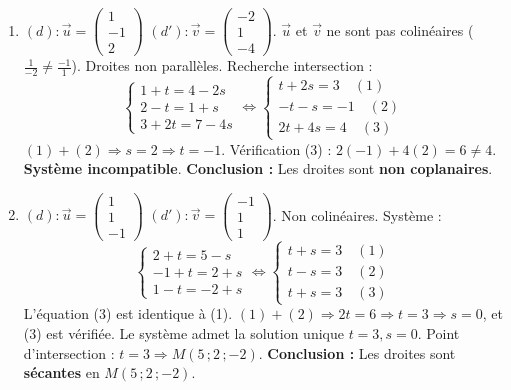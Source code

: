 \documentclass[11pt]{article}
\begin{document}
\begin{corrige}
\begin{enumerate}
\item $(d) : \vec{u}=\begin{pmatrix}1 \\ -1 \\ 2\end{pmatrix}$ \quad $(d') : \vec{v}=\begin{pmatrix}-2 \\ 1 \\ -4\end{pmatrix}$.
$\vec{u}$ et $\vec{v}$ ne sont pas colinéaires ($\frac{1}{-2} \neq \frac{-1}{1}$). Droites non parallèles.
Recherche intersection :
\[
\begin{cases}
1+t = 4-2s \\
2-t = 1+s \\
3+2t = 7-4s
\end{cases}
\iff
\begin{cases}
t+2s = 3 \quad (1)\\
-t-s = -1 \quad (2)\\
2t+4s = 4 \quad (3)
\end{cases}
\]
$(1)+(2) \Rightarrow s = 2 \Rightarrow t = -1$.
Vérification (3) : $2(-1)+4(2)=6 \neq 4$. \textbf{Système incompatible}.
\textbf{Conclusion :} Les droites sont \textbf{non coplanaires}.

\item $(d) : \vec{u}=\begin{pmatrix}1 \\ 1 \\ -1\end{pmatrix}$ \quad $(d') : \vec{v}=\begin{pmatrix}-1 \\ 1 \\ 1\end{pmatrix}$.
Non colinéaires.
Système :
\[
\begin{cases}
2+t = 5-s \\
-1+t = 2+s \\
1-t = -2+s
\end{cases}
\iff
\begin{cases}
t+s = 3 \quad (1)\\
t-s = 3 \quad (2)\\
t+s = 3 \quad (3)
\end{cases}
\]
L'équation (3) est identique à (1). $(1)+(2) \Rightarrow 2t=6 \Rightarrow t=3 \Rightarrow s=0$, et (3) est vérifiée.
Le système admet la solution unique $t=3, s=0$.
Point d'intersection : $t=3 \Rightarrow M(5\,;2\,;-2)$.
\textbf{Conclusion :} Les droites sont \textbf{sécantes} en $M(5\,;2\,;-2)$.


\end{enumerate}
\end{corrige}
\end{document}
